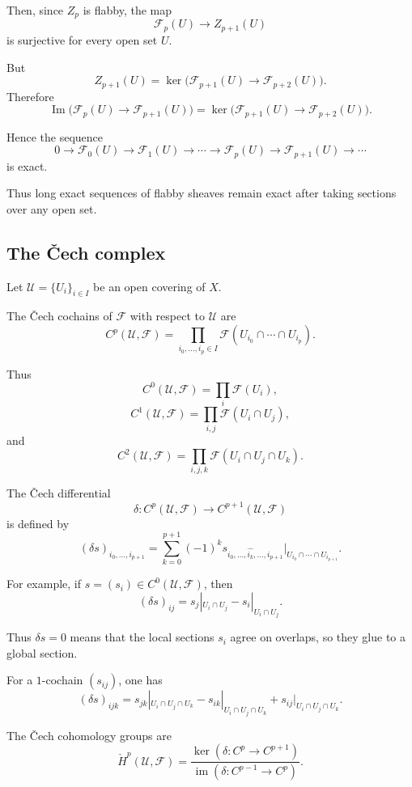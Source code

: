 \documentclass[12pt,a4paper]{article}
\theoremstyle{notespace}
\begin{document}
Then, since $Z_p$ is flabby, the map
\[
\mathcal F_p(U)\longrightarrow Z_{p+1}(U)
\]
is surjective for every open set $U$.

But
\[
Z_{p+1}(U)
=
\ker\bigl(\mathcal F_{p+1}(U)\to \mathcal F_{p+2}(U)\bigr).
\]
Therefore
\[
\operatorname{Im}\bigl(\mathcal F_p(U)\to \mathcal F_{p+1}(U)\bigr)
=
\ker\bigl(\mathcal F_{p+1}(U)\to \mathcal F_{p+2}(U)\bigr).
\]

Hence the sequence
\[
0\longrightarrow \mathcal F_0(U)
\longrightarrow \mathcal F_1(U)
\longrightarrow \cdots
\longrightarrow \mathcal F_p(U)
\longrightarrow \mathcal F_{p+1}(U)
\longrightarrow \cdots
\]
is exact.

Thus long exact sequences of flabby sheaves remain exact after taking
sections over any open set.

\subsection*{The \v{C}ech complex}

Let $\mathcal U=\{U_i\}_{i\in I}$ be an open covering of $X$.

The \v{C}ech cochains of $\mathcal F$ with respect to $\mathcal U$ are
\[
C^p(\mathcal U,\mathcal F)
=
\prod_{i_0,\ldots,i_p\in I}
\mathcal F(U_{i_0}\cap\cdots\cap U_{i_p}).
\]

Thus
\[
C^0(\mathcal U,\mathcal F)
=
\prod_i \mathcal F(U_i),
\]
\[
C^1(\mathcal U,\mathcal F)
=
\prod_{i,j}\mathcal F(U_i\cap U_j),
\]
and
\[
C^2(\mathcal U,\mathcal F)
=
\prod_{i,j,k}\mathcal F(U_i\cap U_j\cap U_k).
\]

The \v{C}ech differential
\[
\delta:C^p(\mathcal U,\mathcal F)
\longrightarrow
C^{p+1}(\mathcal U,\mathcal F)
\]
is defined by
\[
(\delta s)_{i_0,\ldots,i_{p+1}}
=
\sum_{k=0}^{p+1}
(-1)^k
s_{i_0,\ldots,\widehat{i_k},\ldots,i_{p+1}}
\big|_{U_{i_0}\cap\cdots\cap U_{i_{p+1}}}.
\]

For example, if $s=(s_i)\in C^0(\mathcal U,\mathcal F)$, then
\[
(\delta s)_{ij}
=
s_j|_{U_i\cap U_j}
-
s_i|_{U_i\cap U_j}.
\]

Thus $\delta s=0$ means that the local sections $s_i$ agree on overlaps,
so they glue to a global section.

For a $1$-cochain $(s_{ij})$, one has
\[
(\delta s)_{ijk}
=
s_{jk}|_{U_i\cap U_j\cap U_k}
-
s_{ik}|_{U_i\cap U_j\cap U_k}
+
s_{ij}|_{U_i\cap U_j\cap U_k}.
\]

The \v{C}ech cohomology groups are
\[
\check H^p(\mathcal U,\mathcal F)
=
\frac{\ker(\delta:C^p\to C^{p+1})}
{\operatorname{im}(\delta:C^{p-1}\to C^p)}.
\]
\end{document}
